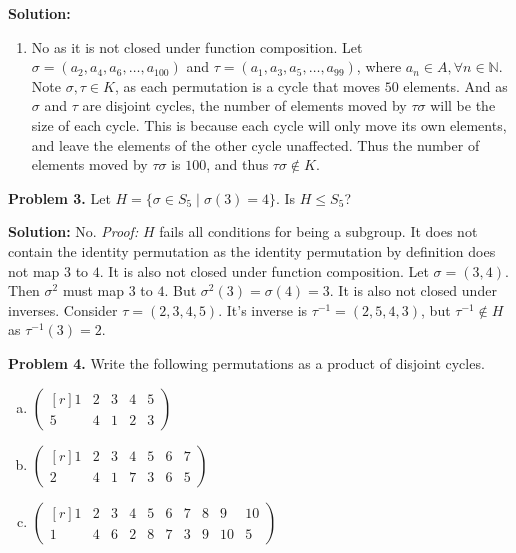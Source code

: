 \documentclass[12pt, letterpaper]{article}
\newenvironment{problem}
    [1]
    {\noindent \textbf{Problem #1.}}
    {\vspace{3mm}}
\newenvironment{solution}
    [0]
    {\noindent \textbf{Solution:}} 
    {\vspace{3mm}}
\begin{document}
\begin{solution}
\begin{enumerate}
        \item No as it is not closed under function composition. Let $\sigma = (a_2, a_4, a_6, \ldots, a_{100})$ and
        $\tau = (a_1, a_3, a_5, \ldots, a_{99})$, where $a_n \in A, \forall n \in \mathbb{N}$. Note $\sigma, \tau \in K$,
        as each permutation is a cycle that moves $50$ elements. And as $\sigma$ and $\tau$ are disjoint cycles, the number of 
        elements moved by $\tau\sigma$ will be the size of each cycle. This is because each cycle will only move its own elements,
        and leave the elements of the other cycle unaffected. Thus the number of elements moved by $\tau\sigma$ is 
        $100$, and thus $\tau\sigma \notin K$.
    \end{enumerate}
\end{solution}

\begin{problem}{3}
    Let $H = \{\sigma \in S_5 \;|\; \sigma(3) = 4\}$. Is $H \le S_5$?
\end{problem}

\begin{solution}
    No. \emph{Proof:} $H$ fails all conditions for being a subgroup. It does not contain the identity
    permutation as the identity permutation by definition does not map $3$ to $4$. It is also not closed
    under function composition. Let $\sigma = (3, 4)$. Then $\sigma^2$ must map $3$ to $4$. But
    $\sigma^2(3) = \sigma(4) = 3$. It is also not closed under inverses. Consider $\tau = (2, 3, 4, 5)$.
    It's inverse is $\tau^{-1} = (2, 5, 4, 3)$, but $\tau^{-1} \notin H$ as $\tau^{-1}(3) = 2$.
\end{solution}

\begin{problem}{4}
    Write the following permutations as a product of disjoint cycles.
    \begin{enumerate}[(a)]
        \item $\begin{pmatrix*}[r] 1 & 2 & 3 & 4 & 5 \\ 5 & 4 & 1 & 2 & 3 \end{pmatrix*}$
        \item $\begin{pmatrix*}[r] 1 & 2 & 3 & 4 & 5 & 6 & 7 \\ 2 & 4 & 1 & 7 & 3 & 6 & 5 \end{pmatrix*}$
        \item $\begin{pmatrix*}[r] 1 & 2 & 3 & 4 & 5 & 6 & 7 & 8 & 9 & 10 \\ 1 & 4 & 6 & 2 & 8 & 7 & 3 & 9 & 10 & 5 \end{pmatrix*}$
    \end{enumerate}
\end{problem}
\end{document}

